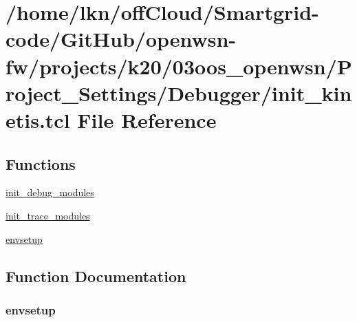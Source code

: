 \hypertarget{03oos__openwsn_2_project___settings_2_debugger_2init__kinetis_8tcl}{}\section{/home/lkn/off\+Cloud/\+Smartgrid-\/code/\+Git\+Hub/openwsn-\/fw/projects/k20/03oos\+\_\+openwsn/\+Project\+\_\+\+Settings/\+Debugger/init\+\_\+kinetis.tcl File Reference}
\label{03oos__openwsn_2_project___settings_2_debugger_2init__kinetis_8tcl}
\subsection*{Functions}
\begin{DoxyCompactItemize}
\item 
\hyperlink{03oos__openwsn_2_project___settings_2_debugger_2init__kinetis_8tcl_a10c80471835dee84e7652764cecbb722}{init\+\_\+debug\+\_\+modules}
\item 
\hyperlink{03oos__openwsn_2_project___settings_2_debugger_2init__kinetis_8tcl_a8ecf61d10da6f21c5b31426f9a235e03}{init\+\_\+trace\+\_\+modules}
\item 
\hyperlink{03oos__openwsn_2_project___settings_2_debugger_2init__kinetis_8tcl_a7f6b4cebda44b6e9d42cc7879ee95e8e}{envsetup}
\end{DoxyCompactItemize}


\subsection{Function Documentation}
\subsubsection[{\texorpdfstring{envsetup}{envsetup}}]{\setlength{\rightskip}{0pt plus 5cm}envsetup}\hypertarget{03oos__openwsn_2_project___settings_2_debugger_2init__kinetis_8tcl_a7f6b4cebda44b6e9d42cc7879ee95e8e}{}\label{03oos__openwsn_2_project___settings_2_debugger_2init__kinetis_8tcl_a7f6b4cebda44b6e9d42cc7879ee95e8e}


